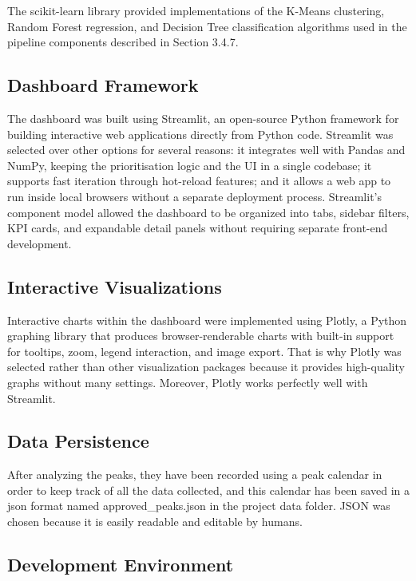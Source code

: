 The scikit-learn library \citep{Pedregosa2011} provided implementations of the K-Means clustering, Random Forest regression, and Decision Tree classification algorithms used in the pipeline components described in Section 3.4.7.

\subsection{Dashboard Framework}

The dashboard was built using Streamlit, an open-source Python framework for building interactive web applications directly from Python code. Streamlit was selected over other options for several reasons: it integrates well with Pandas and NumPy, keeping the prioritisation logic and the UI in a single codebase; it supports fast iteration through hot-reload features; and it allows a web app to run inside local browsers without a separate deployment process. Streamlit's component model allowed the dashboard to be organized into tabs, sidebar filters, KPI cards, and expandable detail panels without requiring separate front-end development.

\subsection{Interactive Visualizations}

Interactive charts within the dashboard were implemented using Plotly, a Python graphing library that produces browser-renderable charts with built-in support for tooltips, zoom, legend interaction, and image export. That is why Plotly was selected rather than other visualization packages because it provides high-quality graphs without many settings. Moreover, Plotly works perfectly well with Streamlit.

\subsection{Data Persistence}

After analyzing the peaks, they have been recorded using a peak calendar in order to keep track of all the data collected, and this calendar has been saved in a json format named approved\_peaks.json in the project data folder. JSON was chosen because it is easily readable and editable by humans.

\subsection{Development Environment}

